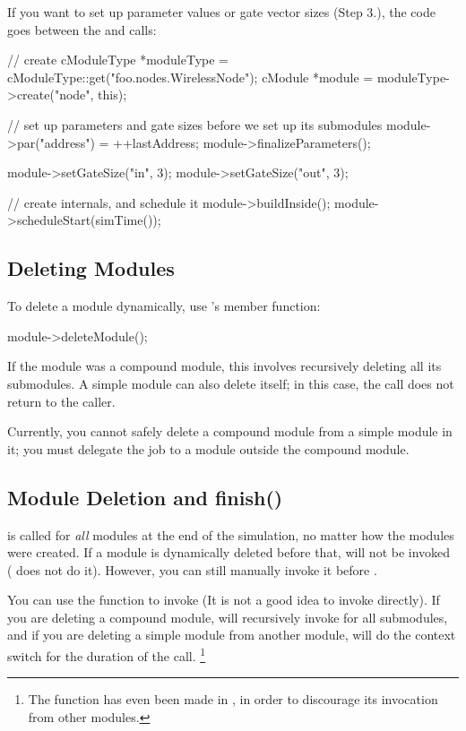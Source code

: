 If you want to set up parameter values or gate vector sizes (Step 3.),
the code goes between the  and
 calls:

\begin{cpp}
// create
cModuleType *moduleType = cModuleType::get("foo.nodes.WirelessNode");
cModule *module = moduleType->create("node", this);

// set up parameters and gate sizes before we set up its submodules
module->par("address") = ++lastAddress;
module->finalizeParameters();

module->setGateSize("in", 3);
module->setGateSize("out", 3);

// create internals, and schedule it
module->buildInside();
module->scheduleStart(simTime());
\end{cpp}


\subsection{Deleting Modules}

To delete a module dynamically, use
's  member function:

\begin{cpp}
module->deleteModule();
\end{cpp}

If the module was a compound module, this involves recursively
deleting all its submodules. A simple module can also delete itself;
in this case, the  call does not return to the
caller.

Currently, you cannot safely delete a compound module from a simple module
in it; you must delegate the job to a module outside the compound
module.


\subsection{Module Deletion and finish()}

 is called for \textit{all} modules at the end of the
simulation, no matter how the modules were created. If a module is
dynamically deleted before that,  will not be invoked
( does not do it). However, you can still manually
invoke it before .

You can use the  function to invoke 
(It is not a good idea to invoke  directly). If you are
deleting a compound module,  will recursively invoke
 for all submodules, and if you are deleting a simple
module from another module,  will do the context switch
for the duration of the call.
  \footnote{The  function has even been made 
  in , in order to discourage its invocation from
  other modules.}

